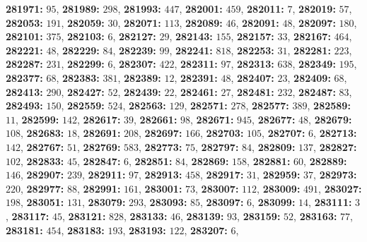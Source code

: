 \textsf{\bfseries 281971:} $95$, \textsf{\bfseries 281989:} $298$, \textsf{\bfseries 281993:} $447$, \textsf{\bfseries 282001:} $459$, \textsf{\bfseries 282011:} $7$, \textsf{\bfseries 282019:} $57$, \textsf{\bfseries 282053:} $191$, \textsf{\bfseries 282059:} $30$, \textsf{\bfseries 282071:} $113$, \textsf{\bfseries 282089:} $46$, \textsf{\bfseries 282091:} $48$, \textsf{\bfseries 282097:} $180$, \textsf{\bfseries 282101:} $375$, \textsf{\bfseries 282103:} $6$, \textsf{\bfseries 282127:} $29$, \textsf{\bfseries 282143:} $155$, \textsf{\bfseries 282157:} $33$, \textsf{\bfseries 282167:} $464$, \textsf{\bfseries 282221:} $48$, \textsf{\bfseries 282229:} $84$, \textsf{\bfseries 282239:} $99$, \textsf{\bfseries 282241:} $818$, \textsf{\bfseries 282253:} $31$, \textsf{\bfseries 282281:} $223$, \textsf{\bfseries 282287:} $231$, \textsf{\bfseries 282299:} $6$, \textsf{\bfseries 282307:} $422$, \textsf{\bfseries 282311:} $97$, \textsf{\bfseries 282313:} $638$, \textsf{\bfseries 282349:} $195$, \textsf{\bfseries 282377:} $68$, \textsf{\bfseries 282383:} $381$, \textsf{\bfseries 282389:} $12$, \textsf{\bfseries 282391:} $48$, \textsf{\bfseries 282407:} $23$, \textsf{\bfseries 282409:} $68$, \textsf{\bfseries 282413:} $290$, \textsf{\bfseries 282427:} $52$, \textsf{\bfseries 282439:} $22$, \textsf{\bfseries 282461:} $27$, \textsf{\bfseries 282481:} $232$, \textsf{\bfseries 282487:} $83$, \textsf{\bfseries 282493:} $150$, \textsf{\bfseries 282559:} $524$, \textsf{\bfseries 282563:} $129$, \textsf{\bfseries 282571:} $278$, \textsf{\bfseries 282577:} $389$, \textsf{\bfseries 282589:} $11$, \textsf{\bfseries 282599:} $142$, \textsf{\bfseries 282617:} $39$, \textsf{\bfseries 282661:} $98$, \textsf{\bfseries 282671:} $945$, \textsf{\bfseries 282677:} $48$, \textsf{\bfseries 282679:} $108$, \textsf{\bfseries 282683:} $18$, \textsf{\bfseries 282691:} $208$, \textsf{\bfseries 282697:} $166$, \textsf{\bfseries 282703:} $105$, \textsf{\bfseries 282707:} $6$, \textsf{\bfseries 282713:} $142$, \textsf{\bfseries 282767:} $51$, \textsf{\bfseries 282769:} $583$, \textsf{\bfseries 282773:} $75$, \textsf{\bfseries 282797:} $84$, \textsf{\bfseries 282809:} $137$, \textsf{\bfseries 282827:} $102$, \textsf{\bfseries 282833:} $45$, \textsf{\bfseries 282847:} $6$, \textsf{\bfseries 282851:} $84$, \textsf{\bfseries 282869:} $158$, \textsf{\bfseries 282881:} $60$, \textsf{\bfseries 282889:} $146$, \textsf{\bfseries 282907:} $239$, \textsf{\bfseries 282911:} $97$, \textsf{\bfseries 282913:} $458$, \textsf{\bfseries 282917:} $31$, \textsf{\bfseries 282959:} $37$, \textsf{\bfseries 282973:} $220$, \textsf{\bfseries 282977:} $88$, \textsf{\bfseries 282991:} $161$, \textsf{\bfseries 283001:} $73$, \textsf{\bfseries 283007:} $112$, \textsf{\bfseries 283009:} $491$, \textsf{\bfseries 283027:} $198$, \textsf{\bfseries 283051:} $131$, \textsf{\bfseries 283079:} $293$, \textsf{\bfseries 283093:} $85$, \textsf{\bfseries 283097:} $6$, \textsf{\bfseries 283099:} $14$, \textsf{\bfseries 283111:} $3$, \textsf{\bfseries 283117:} $45$, \textsf{\bfseries 283121:} $828$, \textsf{\bfseries 283133:} $46$, \textsf{\bfseries 283139:} $93$, \textsf{\bfseries 283159:} $52$, \textsf{\bfseries 283163:} $77$, \textsf{\bfseries 283181:} $454$, \textsf{\bfseries 283183:} $193$, \textsf{\bfseries 283193:} $122$, \textsf{\bfseries 283207:} $6$, 
